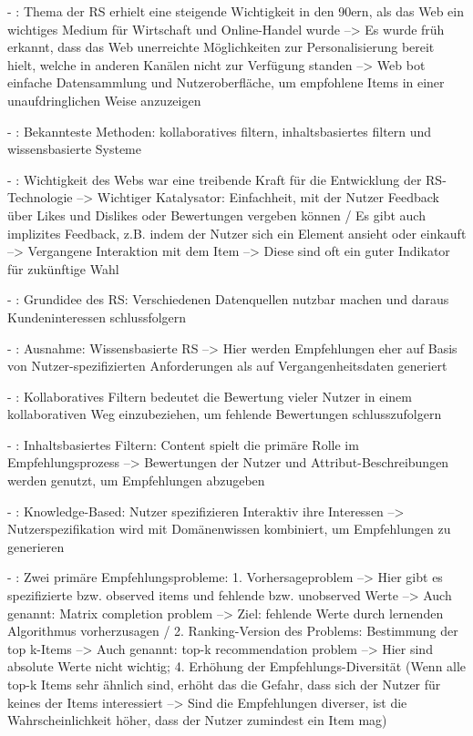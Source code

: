- \cite[S. xvii]{recommenderSystems:2016}: Thema der RS erhielt eine steigende Wichtigkeit in den 90ern, als das Web ein wichtiges Medium für Wirtschaft und Online-Handel wurde --> Es wurde früh erkannt, dass das Web unerreichte Möglichkeiten zur Personalisierung bereit hielt, welche in anderen Kanälen nicht zur Verfügung standen --> Web bot einfache Datensammlung und Nutzeroberfläche, um empfohlene Items in einer unaufdringlichen Weise anzuzeigen

- \cite[S. xvii]{recommenderSystems:2016}: Bekannteste Methoden: kollaboratives filtern, inhaltsbasiertes filtern und wissensbasierte Systeme

- \cite[S. 1]{recommenderSystems:2016}: Wichtigkeit des Webs war eine treibende Kraft für die Entwicklung der RS-Technologie --> Wichtiger Katalysator: Einfachheit, mit der Nutzer Feedback über Likes und Dislikes oder Bewertungen vergeben können / Es gibt auch implizites Feedback, z.B. indem der Nutzer sich ein Element ansieht oder einkauft --> Vergangene Interaktion mit dem Item --> Diese sind oft ein guter Indikator für zukünftige Wahl

- \cite[S. 1]{recommenderSystems:2016}: Grundidee des RS: Verschiedenen Datenquellen nutzbar machen und daraus Kundeninteressen schlussfolgern

- \cite[S. 1f.]{recommenderSystems:2016}: Ausnahme: Wissensbasierte RS --> Hier werden Empfehlungen eher auf Basis von Nutzer-spezifizierten Anforderungen als auf Vergangenheitsdaten generiert

- \cite[S. 2]{recommenderSystems:2016}: Kollaboratives Filtern bedeutet die Bewertung vieler Nutzer in einem kollaborativen Weg einzubeziehen, um fehlende Bewertungen schlusszufolgern

- \cite[S. 2]{recommenderSystems:2016}: Inhaltsbasiertes Filtern: Content spielt die primäre Rolle im Empfehlungsprozess --> Bewertungen der Nutzer und Attribut-Beschreibungen werden genutzt, um Empfehlungen abzugeben

- \cite[S. 2]{recommenderSystems:2016}: Knowledge-Based: Nutzer spezifizieren Interaktiv ihre Interessen --> Nutzerspezifikation wird mit Domänenwissen kombiniert, um Empfehlungen zu generieren

- \cite[S. 3]{recommenderSystems:2016}: Zwei primäre Empfehlungsprobleme: 1. Vorhersageproblem --> Hier gibt es spezifizierte bzw. observed items und fehlende bzw. unobserved Werte --> Auch genannt: Matrix completion problem --> Ziel: fehlende Werte durch lernenden Algorithmus vorherzusagen / 2. Ranking-Version des Problems: Bestimmung der top k-Items --> Auch genannt: top-k recommendation problem --> Hier sind absolute Werte nicht wichtig; 4. Erhöhung der Empfehlungs-Diversität (Wenn alle top-k Items sehr ähnlich sind, erhöht das die Gefahr, dass sich der Nutzer für keines der Items interessiert --> Sind die Empfehlungen diverser, ist die Wahrscheinlichkeit höher, dass der Nutzer zumindest ein Item mag)

